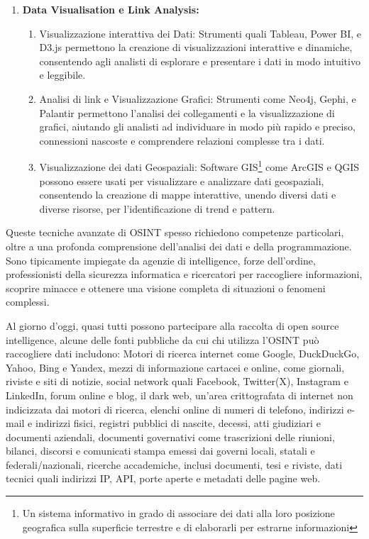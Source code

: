 \begin{enumerate}
\newpage

    \item \textbf{Data Visualisation e Link Analysis:}
        \begin{enumerate}
            \item Visualizzazione interattiva dei Dati: Strumenti quali Tableau, Power BI, e D3.js permettono la creazione di visualizzazioni interattive e dinamiche, consentendo agli analisti di esplorare e presentare i dati in modo intuitivo e leggibile.
            \item Analisi di link e Visualizzazione Grafici: Strumenti come Neo4j, Gephi, e Palantir permettono l'analisi dei collegamenti e la visualizzazione di grafici, aiutando gli analisti ad individuare in modo più rapido e preciso, connessioni nascoste e comprendere relazioni complesse tra i dati.
            \item Visualizzazione dei dati Geospaziali: Software GIS\footnote{Un sistema informativo in grado di associare dei dati alla loro posizione geografica sulla superficie terrestre e di elaborarli per estrarne informazioni} come ArcGIS e QGIS possono essere usati per visualizzare e analizzare dati geospaziali, consentendo la creazione di mappe interattive, unendo diversi dati e diverse risorse, per l'identificazione di trend e pattern.
        \end{enumerate}
	\end{enumerate}


Queste tecniche avanzate di OSINT spesso richiedono competenze particolari, oltre a una profonda comprensione dell'analisi dei dati e della programmazione. Sono tipicamente impiegate da agenzie di intelligence, forze dell'ordine, professionisti della sicurezza informatica e ricercatori per raccogliere informazioni, scoprire minacce e ottenere una visione completa di situazioni o fenomeni complessi.


Al giorno d'oggi, quasi tutti possono partecipare alla raccolta di open source intelligence, alcune delle fonti pubbliche da cui chi utilizza l'OSINT può raccogliere dati includono: Motori di ricerca internet come Google, DuckDuckGo, Yahoo, Bing e Yandex, mezzi di informazione cartacei e online, come giornali, riviste e siti di notizie, social network quali Facebook, Twitter(X), Instagram e LinkedIn, forum online e blog, il dark web, un'area crittografata di internet non indicizzata dai motori di ricerca, elenchi online di numeri di telefono, indirizzi e-mail e indirizzi fisici, registri pubblici di nascite, decessi, atti giudiziari e documenti aziendali, documenti governativi come trascrizioni delle riunioni, bilanci, discorsi e comunicati stampa emessi dai governi locali, statali e federali/nazionali, ricerche accademiche, inclusi documenti, tesi e riviste, dati tecnici quali indirizzi IP, API, porte aperte e metadati delle pagine web.
\newpage

